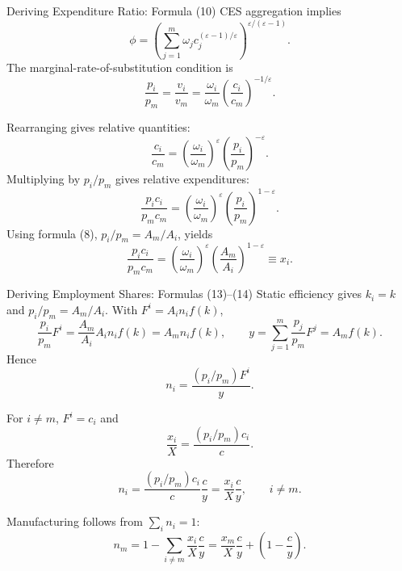 \begin{frame}[label=appendixexpenditure]{Deriving Expenditure Ratio: Formula (10)}
  \scriptsize
  CES aggregation implies
  \[
    \phi=
    \left(\sum_{j=1}^m
    \omega_j c_j^{(\varepsilon-1)/\varepsilon}\right)^{
    \varepsilon/(\varepsilon-1)} .
  \]
  The marginal-rate-of-substitution condition is
  \[
    \frac{p_i}{p_m}
    =
    \frac{v_i}{v_m}
    =
    \frac{\omega_i}{\omega_m}
    \left(\frac{c_i}{c_m}\right)^{-1/\varepsilon}.
  \]

  Rearranging gives relative quantities:
  \[
    \frac{c_i}{c_m}
    =
    \left(\frac{\omega_i}{\omega_m}\right)^\varepsilon
    \left(\frac{p_i}{p_m}\right)^{-\varepsilon}.
  \]
  Multiplying by $p_i/p_m$ gives relative expenditures:
  \[
    \frac{p_ic_i}{p_mc_m}
    =
    \left(\frac{\omega_i}{\omega_m}\right)^\varepsilon
    \left(\frac{p_i}{p_m}\right)^{1-\varepsilon}.
  \]
  Using formula (8), $p_i/p_m=A_m/A_i$, yields
  \[
    \boxed{
    \frac{p_ic_i}{p_mc_m}
    =
    \left(\frac{\omega_i}{\omega_m}\right)^\varepsilon
    \left(\frac{A_m}{A_i}\right)^{1-\varepsilon}
    \equiv x_i
    }.
  \]

  \hyperlink{expenditureratio}{}
\end{frame}

\begin{frame}[label=appendixemploymentshares]{Deriving Employment Shares: Formulas (13)--(14)}
  \scriptsize
  Static efficiency gives $k_i=k$ and $p_i/p_m=A_m/A_i$. With
  $F^i=A_in_if(k)$,
  \[
    \frac{p_i}{p_m}F^i
    =
    \frac{A_m}{A_i}A_in_if(k)
    =
    A_mn_if(k),
    \qquad
    y=\sum_{j=1}^m\frac{p_j}{p_m}F^j=A_mf(k).
  \]
  Hence
  \[
    n_i=\frac{(p_i/p_m)F^i}{y}.
  \]

  For $i\neq m$, $F^i=c_i$ and
  \[
    \frac{x_i}{X}
    =
    \frac{(p_i/p_m)c_i}{c}.
  \]
  Therefore
  \[
    n_i
    =
    \frac{(p_i/p_m)c_i}{c}\frac{c}{y}
    =
    \boxed{\frac{x_i}{X}\frac{c}{y}},
    \qquad i\neq m .
  \]

  Manufacturing follows from $\sum_i n_i=1$:
  \[
    n_m
    =
    1-\sum_{i\neq m}\frac{x_i}{X}\frac{c}{y}
    =
    \boxed{
    \frac{x_m}{X}\frac{c}{y}
    +\left(1-\frac{c}{y}\right)} .
  \]

  \hyperlink{employmentshares}{}
\end{frame}

